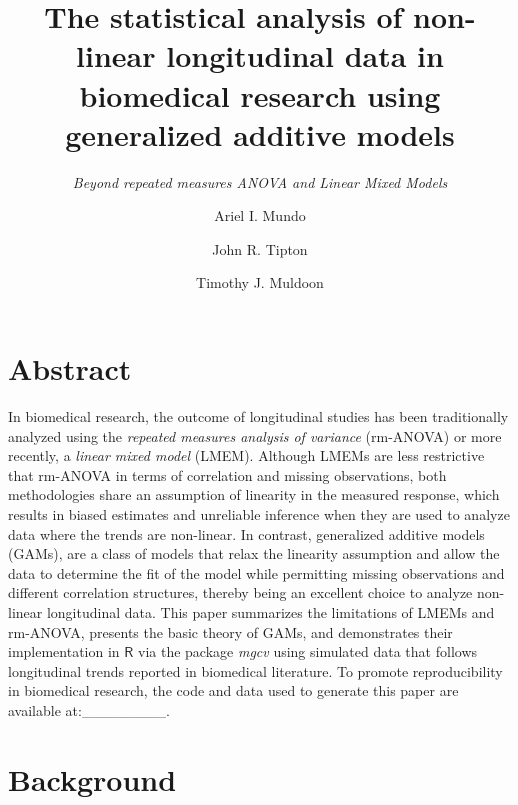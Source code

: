 \documentclass[
]{article}
\author[1]{Ariel I. Mundo}
\author[2]{John R. Tipton}
\author[1]{Timothy J. Muldoon}
\affil[1]{\footnotesize Department of Biomedical Engineering, University of Arkansas, Fayetteville, AR, USA}
\affil[2]{\footnotesize Department of Mathematical Sciences, University of Arkansas, Fayetteville, AR, USA}
\title{\textbf{The statistical analysis of non-linear longitudinal data in biomedical research using generalized additive models}}
\subtitle{\emph{Beyond repeated measures ANOVA and Linear Mixed Models}}
\date{\vspace{-2.5em}}
\begin{document}
\maketitle

{
\setcounter{tocdepth}{2}
\tableofcontents
}
\hypertarget{abstract}{%
\section{Abstract}\label{abstract}}

In biomedical research, the outcome of longitudinal studies has been traditionally analyzed using the \emph{repeated measures analysis of variance} (rm-ANOVA) or more recently, a \emph{linear mixed model} (LMEM). Although LMEMs are less restrictive that rm-ANOVA in terms of correlation and missing observations, both methodologies share an assumption of linearity in the measured response, which results in biased estimates and unreliable inference when they are used to analyze data where the trends are non-linear. In contrast, generalized additive models (GAMs), are a class of models that relax the linearity assumption and allow the data to determine the fit of the model while permitting missing observations and different correlation structures, thereby being an excellent choice to analyze non-linear longitudinal data. This paper summarizes the limitations of LMEMs and rm-ANOVA, presents the basic theory of GAMs, and demonstrates their implementation in \(\textsf{R}\) via the package \emph{mgcv} using simulated data that follows longitudinal trends reported in biomedical literature. To promote reproducibility in biomedical research, the code and data used to generate this paper are available at:\_\_\_\_\_\_\_\_.

\hypertarget{background}{%
\section{Background}\label{background}}
\end{document}
